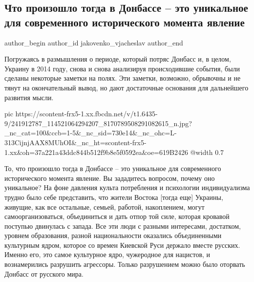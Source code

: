  
 
 
 
 
 
\subsection{Что произошло тогда в Донбассе – это уникальное для современного исторического момента явление}
\label{sec:15_09_2021.fb.jakovenko_vjacheslav.1.donbass_vojna_razmyshlenia}
 
\ifcmt
 author_begin
   author_id jakovenko_vjacheslav
 author_end
\fi

Погружаясь в размышления о периоде, который потряс Донбасс и, в целом, Украину
в 2014 году, снова и снова анализируя происходившие события, были сделаны
некоторые заметки на полях. Эти заметки, возможно, обрывочны и не тянут на
окончательный вывод, но дают достаточные основания для дальнейшего развития
мысли.

\ifcmt
  pic https://scontent-frx5-1.xx.fbcdn.net/v/t1.6435-9/241912787_114521064294207_8170789508291082615_n.jpg?_nc_cat=100&ccb=1-5&_nc_sid=730e14&_nc_ohc=L-313CijnjAAX8MUhOI&_nc_ht=scontent-frx5-1.xx&oh=37a221a43ddc844b512f9b8e5f0592ea&oe=619B2426
  @width 0.7
\fi

То, что произошло тогда в Донбассе – это уникальное для современного
исторического момента явление. Вы зададитесь вопросом, почему оно уникальное?
На фоне давления культа потребления и психологии индивидуализма трудно было
себе представить, что жители Востока [тогда еще] Украины, живущие, как все
остальные, семьей, работой, накоплением, могут самоорганизоваться, объединиться
и дать отпор той силе, которая кровавой поступью двинулась с запада. Все эти
люди с разными интересами, достатком, уровнем образования, разной
национальности оказались объединенными культурным ядром, которое со времен
Киевской Руси держало вместе русских. Именно его, это самое культурное ядро,
чужеродное для нацистов, и вознамерились разрушить агрессоры. Только
разрушением можно было оторвать Донбасс от русского мира.

